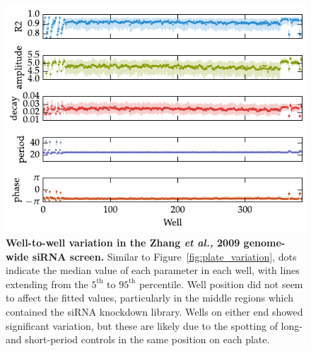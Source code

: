 \documentclass[11pt, letterpaper]{article}
\begin{document}
\begin{figure}[tbp]
  \begin{center}
    \includegraphics[]{figures/pdfs/zhang_wells.pdf}
  \end{center}
  \caption{{\bfseries Well-to-well variation in the Zhang {\itshape et al.,} 2009 genome-wide siRNA screen.} Similar to Figure~\ref{fig:plate_variation}, dots indicate the median value of each parameter in each well, with lines extending from the $5^\text{th}$ to $95^\text{th}$ percentile. Well position did not seem to affect the fitted values, particularly in the middle regions which contained the siRNA knockdown library. Wells on either end showed significant variation, but these are likely due to the spotting of long- and short-period controls in the same position on each plate.}
\label{fig:well_variation}
\end{figure}
\end{document}
